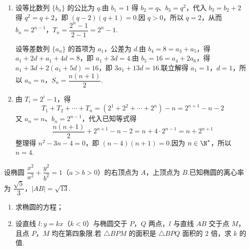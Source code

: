 \begin{solution}
\begin{enumerate}
\item 设等比数列 \(\{b_n\}\) 的公比为 \(q\).由 \(b_1=1\) 得 \(b_2=q\)、\(b_3=q^2\)，代入 \(b_3=b_2+2\) 得 \(q^2=q+2\)，即 \((q-2)(q+1)=0\).因 \(q>0\)，所以 \(q=2\)，从而 \(b_n=2^{n-1}\)，\(T_n=\dfrac{2^n-1}{2-1}=2^n-1\).

设等差数列 \(\{a_n\}\) 的首项为 \(a_1\)，公差为 \(d\).由 \(b_4=8=a_3+a_5\)，得
\(a_1+2d+a_1+4d=8\)，即 \(a_1+3d=4\).由 \(b_5=16=a_4+2a_6\)，得
\(a_1+3d+2(a_1+5d)=16\)，即 \(3a_1+13d=16\).联立解得 \(a_1=1\)，\(d=1\)，所以 \(a_n=n\)，\(S_n=\dfrac{n(n+1)}2\).

\item 由 \(T_i=2^i-1\)，得
\[
T_1+T_2+\cdots+T_n=(2^1+2^2+\cdots+2^n)-n=2^{n+1}-n-2
\]
又 \(a_n=n\)、\(b_n=2^{n-1}\)，代入已知等式得
\[
\frac{n(n+1)}2+2^{n+1}-n-2=n+4\cdot2^{n-1}=n+2^{n+1}
\]
整理得 \(n^2-3n-4=0\)，即 \((n-4)(n+1)=0\).因为 \(n\in\N^*\)，所以 \(n=4\).
\end{enumerate}
\end{solution}

\begin{problem}

设椭圆 \(\dfrac{x^2}{a^2}+\dfrac{y^2}{b^2}=1\)（\(a>b>0\)）的右顶点为 \(A\)，上顶点为 \(B\).已知椭圆的离心率为 \(\dfrac{\sqrt5}{3}\)，\(|AB|=\sqrt{13}\).

\begin{enumerate}
\item 求椭圆的方程；
\item 设直线 \(l:y=kx\)（\(k<0\)）与椭圆交于 \(P\)，\(Q\) 两点，\(l\) 与直线 \(AB\) 交于点 \(M\)，且点 \(P\)，\(M\) 均在第四象限.若 \(\triangle BPM\) 的面积是 \(\triangle BPQ\) 面积的 \(2\) 倍，求 \(k\) 的值.
\end{enumerate}
\end{problem}

